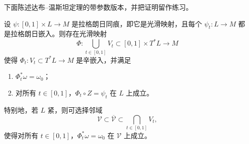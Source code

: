 下面陈述达布--温斯坦定理的带参数版本，并把证明留作练习。

\begin{exercise}\label{ex:parametrized-darboux-weinstein}
设 $\psi:[0,1]\times L\to M$ 是拉格朗日同痕，即它是光滑映射，且每个
$\psi_t:L\to M$ 都是拉格朗日嵌入。则存在光滑映射
\[
 \Phi:\bigcup_{t\in[0,1]}V_t\subset[0,1]\times T^*L\longrightarrow M
\]
使得 $\Phi_t:V_t\subset T^*L\to M$ 是辛嵌入，并满足
\begin{enumerate}[label=(\arabic*)]
\item $\Phi_t^*\omega=\omega_0$；
\item 对所有 $t\in[0,1]$，$\Phi_t\circ Z=\psi_t$ 在 $L$ 上成立。
\end{enumerate}
特别地，若 $L$ 紧，则可选择邻域
\[
 \mathcal V\subset\overline{\mathcal V}\subset\bigcap_{t\in[0,1]}V_t,
\]
使得对所有 $t\in[0,1]$，$\Phi_t^*\omega=\omega_0$ 在 $\mathcal V$ 上成立。
\end{exercise}

